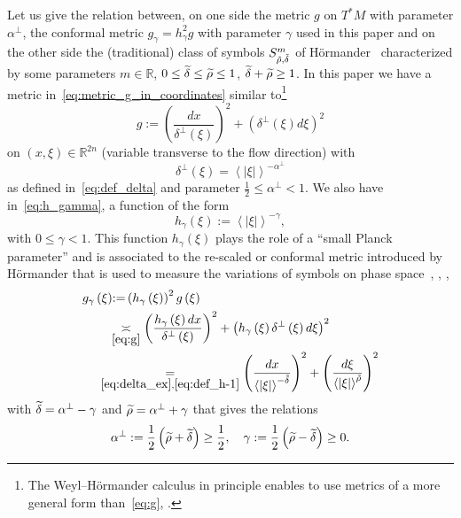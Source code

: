 \documentclass[10pt]{amsart}
\theoremstyle{definition}\newtheorem{defi}[theo]{Definition}\newtheorem{rema}[theo]{Remark}\newtheorem{exam}[theo]{Example}\newtheorem{exem}[theo]{Example}\newtheorem{nota}[theo]{Notation}
\newcommand{\bbR}{\mathbb{R}}
\let\oldtilde\tilde
\renewcommand*{\tilde}[1]{\mathchoice{\widetilde{#1}}{\widetilde{#1}}{\oldtilde{#1}}{\oldtilde{#1}}}
\begin{document}
Let us give the relation between, on one side the metric $g$ on $T^{*}M$ with parameter $\alpha^{\perp}$, the conformal metric $g_{\gamma}=h_{\gamma}^{2}g$ with parameter $\gamma$ used in this paper and on the other side the (traditional) class of symbols $S_{\tilde{\rho},\tilde{\delta}}^{m}$ of H\"ormander~\cite[Chap.~18]{hormander_3} characterized by some parameters $m\in\bbR$, $0\leq\tilde{\delta}\leq\tilde{\rho}\leq1$, $\tilde{\delta}+\tilde{\rho}\geq1$. In this paper we have a metric in~\eqref{eq:metric_g_in_coordinates} similar to\footnote{The Weyl--H\"ormander calculus in principle enables to use metrics of a more general form than~\eqref{eq:g}, \cite{hormander1979weyl}.}
\begin{equation}\label{eq:g}
g:=\left(\frac{dx}{\delta^{\perp}\left(\xi\right)}\right)^{2}+\left(\delta^{\perp}\left(\xi\right)d\xi\right)^{2}
\end{equation}
on $(x,\xi)\in\bbR^{2n}$ (variable transverse to the flow direction) with
\begin{equation}\label{eq:delta_ex}
\delta^{\perp}\left(\xi\right)=\left\langle \left|\xi\right|\right\rangle ^{-\alpha^{\perp}}
\end{equation}
as defined in~\eqref{eq:def_delta} and parameter $\frac{1}{2}\leq\alpha^{\perp}<1$. We also have in~\eqref{eq:h_gamma}, a function of the form
\begin{equation}\label{eq:def_h-1}
h_{\gamma}\left(\xi\right):=\left\langle \left|\xi\right|\right\rangle ^{-\gamma},
\end{equation}
with $0\leq\gamma<1$. This function $h_{\gamma}(\xi)$ plays the role of a ``small Planck parameter'' and is associated to the re-scaled or conformal metric introduced by H\"ormander that is used to measure the variations of symbols on phase space~\cite{hormander1979weyl}, \cite[Chap.18]{hormander_3}, \cite[p.~22, p.~68]{lerner2011metrics},  \cite{nicola_rodino_livre_11}
\begin{align*}
g_{\gamma}\left(\xi\right) & {:=}\left(h_{\gamma}\left(\xi\right)\right)^{2}g\left(\xi\right)\\
& \!\!\underset{\eqref{eq:g}}{\asymp}\left(\frac{h_{\gamma}\left(\xi\right)dx}{\delta^{\perp}\left(\xi\right)}\right)^{2}+\left(h_{\gamma}\left(\xi\right)\delta^{\perp}\left(\xi\right)d\xi\right)^{2}\\
& \mkern-22mu\underset{\eqref{eq:delta_ex},\eqref{eq:def_h-1}}{=}\left(\frac{dx}{\left\langle \left|\xi\right|\right\rangle ^{-\tilde{\delta}}}\right)^{2}+\left(\frac{d\xi}{\left\langle \left|\xi\right|\right\rangle ^{\tilde{\rho}}}\right)^{2}
\end{align*}
with $\tilde{\delta}=\alpha^{\perp}-\gamma$ and $\tilde{\rho}=\alpha^{\perp}+\gamma$ that gives the relations
\begin{equation}\label{eq:relations-1}
\alpha^{\perp}:=\frac{1}{2}\left(\tilde{\rho}+\tilde{\delta}\right)\geq\frac{1}{2},\quad\gamma:=\frac{1}{2}\left(\tilde{\rho}-\tilde{\delta}\right)\geq0.
\end{equation}
\end{document}
